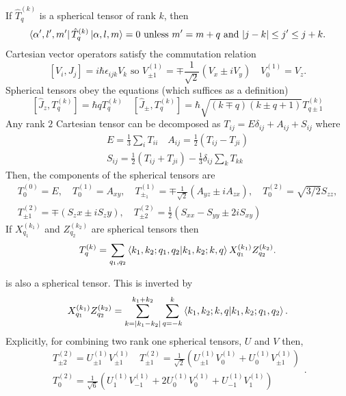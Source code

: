 \documentclass{article}
\begin{document}
	If $\hat{T}_q^{(k)}$ is a spherical tensor of rank  $k$, then 
     \[
			 \bra{\alpha',l',m'} \hat{T}_q^{(k)} \ket{\alpha, l, m} = 0 
    \text{ unless } m' = m + q \text{ and } |j-k| \leq j' \leq j+k
    .\] 
    Cartesian vector operators satisfy the commutation relation
    \[
      [V_i, J_j] = i \hbar \epsilon_{ijk} V_k \text{ so }
			V^{(1)}_{\pm 1} = \mp \frac{1}{\sqrt 2} (V_x \pm i V_y) \quad V_0^{(1)} = V_z
    .\] 
    Spherical tensors obey the equations (which suffices as a definition)
    \[
			[\hat{J}_z , T_q^{(k)}] = \hbar q T_q^{(k)} \quad 
			[\hat{J}_\pm , T_q^{(k)} ] = \hbar \sqrt{(k\mp q)(k\pm q + 1)}T_{q\pm
			1}^{(k)}
    \] 
    Any rank $2$ Cartesian tensor can be decomposed as 
    $T_{ij} = E \delta_{ij} + A_{ij} + S_{ij} $ where  \[
    \begin{split}
      E = \frac{1}{3} \sum_i T_{ii} \quad A_{ij} = \frac{1}{2}(T_{ij} - T_{ji}) \\
      S_{ij} = \frac{1}{2}(T_{ij} + T_{ji}) - \frac{1}{3} \delta_{ij} \sum_k T_{kk} 
    \end{split}
    \] 
    Then, the components of the spherical tensors are 
    \[
      \begin{split}
				T_0^{(0)} = E ,\quad T_0^{(1)} = A_{xy} ,\quad 
				T_{\pm_1}^{(1)} = \mp \frac{1}{\sqrt 2} (A_{yz} \pm i A_{zx}) ,\quad
				T_0^{(2)} = \sqrt{3/2} S_{zz}, \\
      T_{\pm 1}^{(2)} = \mp (S_zx \pm i S_zy) ,\quad 
      T_{\pm 2}^{(2)} = \frac{1}{2}(S_{xx} - S_{yy} \pm 2 i S_{xy})
      \end{split}
    \] 
		If $X_{q_1}^{(k_1)}$ and $Z_{q_2}^{(k_2)}$ are spherical tensors then 
    \[
			T_q^{(k)} = \sum_{q_1, q_2}
			\bra{k_1,k_2;q_1,q_2}\ket{k_1,k_2;k,q}X^{(k_1)}_{q_1}Z_{q_2}^{(k_2)}
    .\] 
    
    is also a spherical tensor. This is inverted by 
    \[
			X_{q_1}^{(k_1)}Z_{q_2}^{(k_2)} = \sum_{k=|k_1-k_2|}^{k_1+k_2} \sum_{q = -k}^k
      \bra{k_1,k_2;k,q}\ket{k_1,k_2;q_1,q_2}
    .\] 
    Explicitly, for combining two rank one spherical tensors, $U$ and  $V$ then,
     \[
    \begin{split}
			T^{(2)}_{\pm 2} = U_{\pm 1}^{(1)} V_{\pm 1}^{(1)} \quad T^{(2)}_{\pm 1} = \frac{1}{\sqrt 2}
      (U_{\pm 1}^{(1)}V_0^{(1)}  + U_0^{(1)} V_{\pm 1}^{(1)}) \\
			T^{(2)}_0 = \frac{1}{\sqrt 6 } (U_1^{(1)} V_{-1}^{(1)} + 2 U_0^{(1)} V_0^{(1)} + U_{-1}^{(1)}V_1^{(1)})
    \end{split}
    .\] 
\end{document}
